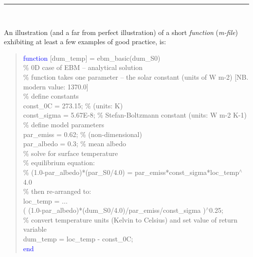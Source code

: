 \documentclass{tufte-book} %
\newenvironment{docspec}{\begin{quotation}\ttfamily\parskip0pt\parindent0pt\ignorespaces}{\end{quotation}}
\begin{document}
\vspace{1mm}
\noindent\rule{4cm}{0.5pt}
\vspace{2mm}\

\noindent An illustration (and a far from perfect illustration) of a short \textit{function} (\textit{m-file}) exhibiting at least a few examples of good practice, is:

\begin{docspec}
\textcolor{blue}{function} [dum\_temp] = ebm\_basic(dum\_S0)
\textcolor[rgb]{0,0.501961,0}{\\\% 0D case of EBM -- analytical solution
\\\% function takes one parameter -- the solar constant (units of W m-2) [NB. modern value: 1370.0]
\\\% define constants}
\\const\_0C = 273.15; \textcolor[rgb]{0,0.501961,0}{\% (units: K)}
\\const\_sigma = 5.67E-8; \textcolor[rgb]{0,0.501961,0}{\% Stefan-Boltzmann constant (units: W m-2 K-1)}
\textcolor[rgb]{0,0.501961,0}{\\\% define model parameters}
\\par\_emiss = 0.62; \textcolor[rgb]{0,0.501961,0}{\% (non-dimensional)}
\\par\_albedo = 0.3; \textcolor[rgb]{0,0.501961,0}{\% mean albedo}
\textcolor[rgb]{0,0.501961,0}{\\\% solve for surface temperature
\\\% equilibrium equation:
\\\% (1.0-par\_albedo)*(par\_S0/4.0) = par\_emiss*const\_sigma*loc\_temp\(^{\wedge}\)4.0
\\\% then re-arranged to:}
\\loc\_temp = ...
\\( (1.0-par\_albedo)*(dum\_S0/4.0)/par\_emiss/const\_sigma )\(^{\wedge}\)0.25;
\textcolor[rgb]{0,0.501961,0}{\\\% convert temperature units (Kelvin to Celsius) and set value of return variable}
\\dum\_temp = loc\_temp - const\_0C;
\textcolor{blue}{\\end}
\end{docspec} 
\end{document}

